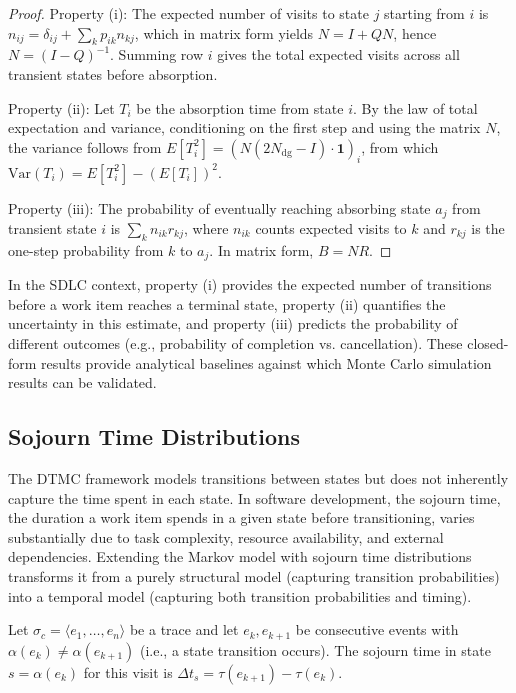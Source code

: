 \begin{proof}
Property (i): The expected number of visits to state $j$ starting from
$i$ is $n_{ij} = \delta_{ij} + \sum_k p_{ik} n_{kj}$, which in matrix
form yields $N = I + QN$, hence $N = (I - Q)^{-1}$. Summing row $i$
gives the total expected visits across all transient states before
absorption.

Property (ii): Let $T_i$ be the absorption time from state $i$. By the
law of total expectation and variance, conditioning on the first step
and using the matrix $N$, the variance follows from
$E[T_i^2] = (N(2N_{\text{dg}} - I) \cdot \mathbf{1})_i$, from which
$\text{Var}(T_i) = E[T_i^2] - (E[T_i])^2$.

Property (iii): The probability of eventually reaching absorbing state
$a_j$ from transient state $i$ is $\sum_{k} n_{ik} r_{kj}$, where
$n_{ik}$ counts expected visits to $k$ and $r_{kj}$ is the one-step
probability from $k$ to $a_j$. In matrix form, $B = NR$.
\end{proof}

In the SDLC context, property (i) provides the expected number of
transitions before a work item reaches a terminal state, property (ii)
quantifies the uncertainty in this estimate, and property (iii) predicts
the probability of different outcomes (e.g., probability of completion
vs. cancellation). These closed-form results provide analytical baselines
against which Monte Carlo simulation results can be validated.


\subsection{Sojourn Time Distributions}
\label{sec:sojourn-time}

The DTMC framework models transitions between states but does not
inherently capture the time spent in each state. In software development,
the sojourn time, the duration a work item spends in a given state before
transitioning, varies substantially due to task complexity, resource
availability, and external dependencies. Extending the Markov model with
sojourn time distributions transforms it from a purely structural model
(capturing transition probabilities) into a temporal model (capturing both
transition probabilities and timing).

\begin{definition}
\label{def:sojourn-time}
Let $\sigma_c = \langle e_1, \ldots, e_n \rangle$ be a trace and let
$e_k, e_{k+1}$ be consecutive events with $\alpha(e_k) \neq
\alpha(e_{k+1})$ (i.e., a state transition occurs). The sojourn time in
state $s = \alpha(e_k)$ for this visit is
$\Delta t_s = \tau(e_{k+1}) - \tau(e_k)$.
\end{definition}

